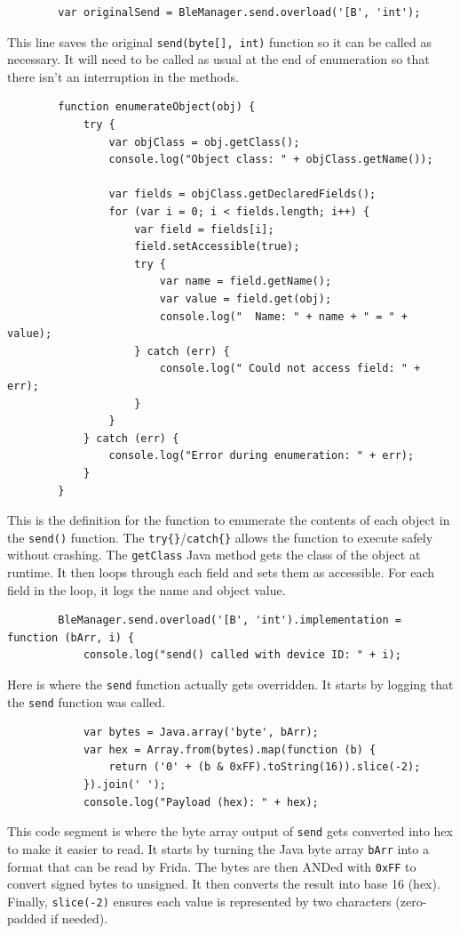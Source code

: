 	\begin{lstlisting}
		var originalSend = BleManager.send.overload('[B', 'int');
	\end{lstlisting}
	This line saves the original \texttt{send(byte[], int)} function so it can be called as necessary. It will need to be called as usual at the end of enumeration so that there isn’t an interruption in the methods.
	
	\begin{lstlisting}
		function enumerateObject(obj) {
			try {
				var objClass = obj.getClass();
				console.log("Object class: " + objClass.getName());
				
				var fields = objClass.getDeclaredFields();
				for (var i = 0; i < fields.length; i++) {
					var field = fields[i];
					field.setAccessible(true);
					try {
						var name = field.getName();
						var value = field.get(obj);
						console.log("  Name: " + name + " = " + value);
					} catch (err) {
						console.log(" Could not access field: " + err);
					}
				}
			} catch (err) {
				console.log("Error during enumeration: " + err);
			}
		}
	\end{lstlisting}
	This is the definition for the function to enumerate the contents of each object in the \texttt{send()} function. The \texttt{try\{\}}/\texttt{catch\{\}} allows the function to execute safely without crashing. The \texttt{getClass} Java method gets the class of the object at runtime. It then loops through each field and sets them as accessible. For each field in the loop, it logs the name and object value.
	
	\begin{lstlisting}
		BleManager.send.overload('[B', 'int').implementation = function (bArr, i) {
			console.log("send() called with device ID: " + i);
		\end{lstlisting}
		Here is where the \texttt{send} function actually gets overridden. It starts by logging that the \texttt{send} function was called.
		
		\begin{lstlisting}
			var bytes = Java.array('byte', bArr);
			var hex = Array.from(bytes).map(function (b) {
				return ('0' + (b & 0xFF).toString(16)).slice(-2);
			}).join(' ');
			console.log("Payload (hex): " + hex);
		\end{lstlisting}
		This code segment is where the byte array output of \texttt{send} gets converted into hex to make it easier to read. It starts by turning the Java byte array \texttt{bArr} into a format that can be read by Frida. The bytes are then ANDed with \texttt{0xFF} to convert signed bytes to unsigned. It then converts the result into base 16 (hex). Finally, \texttt{slice(-2)} ensures each value is represented by two characters (zero-padded if needed).
		
